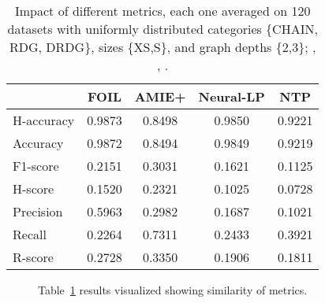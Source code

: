 \documentclass[letterpaper]{article} \usepackage{aaai20}  \usepackage{times}  \usepackage{helvet} \usepackage{courier}  \usepackage[hyphens]{url}  \usepackage{graphicx} \urlstyle{rm} \def\UrlFont{\rm}  \usepackage{graphicx}  \frenchspacing  \setlength{\pdfpagewidth}{8.5in}  \setlength{\pdfpageheight}{11in}  \usepackage{amsthm}
\theoremstyle{definition}
\begin{document}
\begin{table}[h!]
    \centering
\begin{tabular}{lcccc}
    \toprule
    & FOIL & AMIE+ & Neural-LP & NTP \\
     \midrule
    H-accuracy & 0.9873 &	0.8498 & 	0.9850 &	0.9221 \\
    Accuracy & 0.9872 &	0.8494 &	0.9849 &	0.9219\\
    F1-score &  0.2151 &	0.3031 &	0.1621 & 	0.1125 \\
    H-score & 0.1520 &	0.2321 &	0.1025 &	0.0728 \\
    Precision & 0.5963 &	0.2982 &	0.1687 &	0.1021 \\ Recall & 0.2264 &	0.7311 &	0.2433 &	0.3921 \\
    R-score & 0.2728 &	0.3350  & 0.1906 & 0.1811 \\
    \bottomrule
    \end{tabular}
    \caption{Impact of different metrics, each one averaged on 120 datasets with uniformly distributed categories  \{CHAIN, RDG, DRDG\}, sizes  \{XS,S\}, and graph depths  \{2,3\}; , , .}
    \label{tab:result_1}
\end{table}

\begin{figure}
\centering
{}
\caption{Table~\ref{tab:result_1} results visualized showing  similarity of metrics.
}
\label{fig:measures}
\end{figure}
\end{document}
